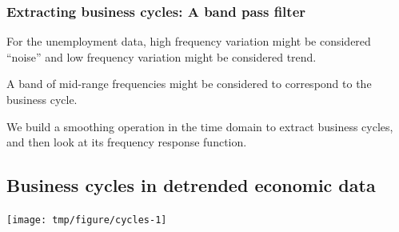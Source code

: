 \begin{frame}[fragile]

\frametitle{Extracting business cycles: A band pass filter}

\bi

\item For the unemployment data, high frequency variation might be considered ``noise'' and low frequency variation might be considered trend.

\item A band of mid-range frequencies might be considered to correspond to the business cycle.

\item We build a smoothing operation in the time domain to extract business cycles, and then look at its frequency response function.
\ei

\begin{knitrout}\small
{}\color{fgcolor}\begin{kframe}
\begin{alltt}
 \hlkwb{<-} \hlstd{(}\hlopt{~}\hlstd{=}\hlstd{)}\hlopt{$}
  \hlstd{=}\hlstd{,}\hlstd{=}\hlstd{)}
 \hlkwb{<-}  \hlopt{-} \hlopt{~}\hlstd{=}\hlstd{)}\hlopt{$}
  \hlstd{=}\hlstd{,}\hlstd{=}\hlstd{)}
 \hlkwb{<-}  \hlopt{-}  \hlopt{-} 
\hlstd{(}
  \hlstd{=}\hlstd{)}
\end{alltt}
\end{kframe}
\end{knitrout}

\vspace{10mm}

\end{frame}


\subsection{Business cycles in detrended economic data}

\begin{frame}[fragile]

\begin{knitrout}\small
{}\color{fgcolor}

{\centering \texttt{[image: tmp/figure/cycles-1]} 

}


\end{knitrout}

\end{frame}

